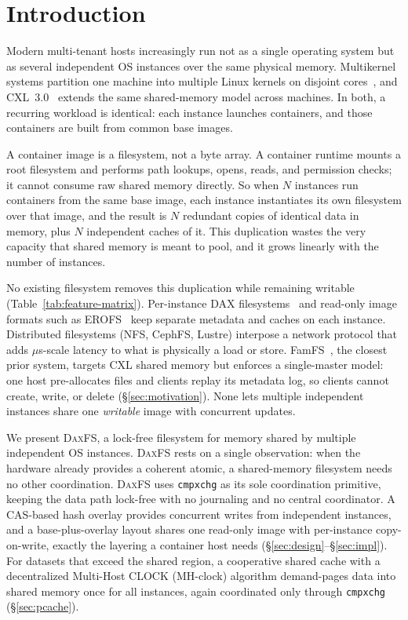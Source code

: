 \documentclass[letterpaper,twocolumn,10pt]{article}
\newcommand{\daxfs}{\textsc{DaxFS}\xspace}
\begin{document}
\section{Introduction}
\label{sec:intro}

Modern multi-tenant hosts increasingly run not as a single operating
system but as several independent OS instances over the same physical
memory.  Multikernel systems partition one machine into multiple Linux
kernels on disjoint cores~\cite{baumann09:multikernel,barbalace15:popcorn},
and CXL~3.0~\cite{cxl22:spec} extends the same shared-memory model
across machines.  In both, a recurring workload is identical: each
instance launches containers, and those containers are built from
common base images.

A container image is a filesystem, not a byte array.  A container
runtime mounts a root filesystem and performs path lookups, opens,
reads, and permission checks; it cannot consume raw shared memory
directly.  So when $N$ instances run containers from the same base
image, each instance instantiates its own filesystem over that image,
and the result is $N$ redundant copies of identical data in memory,
plus $N$ independent caches of it.  This duplication wastes the very
capacity that shared memory is meant to pool, and it grows linearly
with the number of instances.

No existing filesystem removes this duplication while remaining
writable (Table~\ref{tab:feature-matrix}).  Per-instance DAX
filesystems~\cite{xu16:nova,dulloor14:pmfs} and read-only image formats
such as EROFS~\cite{gao20:erofs} keep separate metadata and caches on
each instance.  Distributed filesystems (NFS, CephFS, Lustre) interpose
a network protocol that adds $\mu$s-scale latency to what is physically
a load or store.  FamFS~\cite{groves24:Famfs}, the closest prior
system, targets CXL shared memory but enforces a single-master model:
one host pre-allocates files and clients replay its metadata log, so
clients cannot create, write, or delete (\S\ref{sec:motivation}).  None
lets multiple independent instances share one \emph{writable} image
with concurrent updates.

We present \daxfs, a lock-free filesystem for memory shared by multiple
independent OS instances.  \daxfs rests on a single observation: when
the hardware already provides a coherent atomic, a shared-memory
filesystem needs no other coordination.  \daxfs uses \texttt{cmpxchg}
as its sole coordination primitive, keeping the data path lock-free
with no journaling and no central coordinator.  A CAS-based hash
overlay provides concurrent writes from independent instances, and a
base-plus-overlay layout shares one read-only image with per-instance
copy-on-write, exactly the layering a container host needs
(\S\ref{sec:design}--\S\ref{sec:impl}).  For datasets that exceed the
shared region, a cooperative shared cache with a decentralized
Multi-Host CLOCK (MH-clock) algorithm demand-pages data into shared
memory once for all instances, again coordinated only through
\texttt{cmpxchg} (\S\ref{sec:pcache}).
\end{document}
